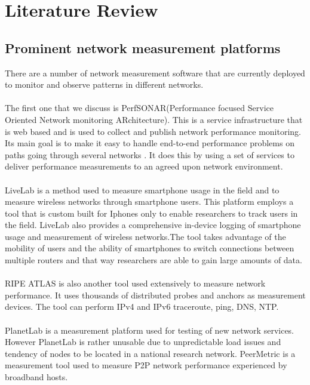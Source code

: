 \section{Literature Review}
\subsection{Prominent network measurement platforms}
There are a number of network measurement software
that are currently deployed to monitor and observe patterns in different networks.
\paragraph{}
The first one that we discuss is PerfSONAR(Performance focused
Service Oriented Network monitoring ARchitecture)\cite{10.1007/11596141_19}. This is a service infrastructure that is web based and is used to collect and publish network performance monitoring\cite{article2}. Its main goal is to make it easy to handle end-to-end performance problems on paths going through several networks \cite{article2}. It does this by using a set of services to deliver performance measurements to an agreed upon network environment.

\paragraph{}
LiveLab is a method used to measure smartphone usage in the field and to measure wireless networks through smartphone users\cite{article3}. This platform employs a tool that is custom built for Iphones only to enable researchers to track users in the field. LiveLab also provides a comprehensive in-device logging of smartphone usage and measurement of wireless
networks\cite{article3}.The tool takes advantage of the mobility
of users and the ability of smartphones to switch connections between multiple routers and that way researchers are able to gain large amounts of data\cite{article3}.

\paragraph{}
RIPE ATLAS is also another tool used extensively
to measure network performance. It uses thousands of
distributed probes and anchors as measurement devices.
The tool can perform IPv4 and IPv6 traceroute, ping,
DNS, NTP\cite{7076582}.
\paragraph{}
PlanetLab is a measurement platform used for testing of new network services. However PlanetLab is rather unusable due to unpredictable load issues and tendency of nodes to be located in a national research network\cite{7076582}.
PeerMetric is a measurement tool used to measure P2P network performance experienced by broadband hosts\cite{7076582}.
